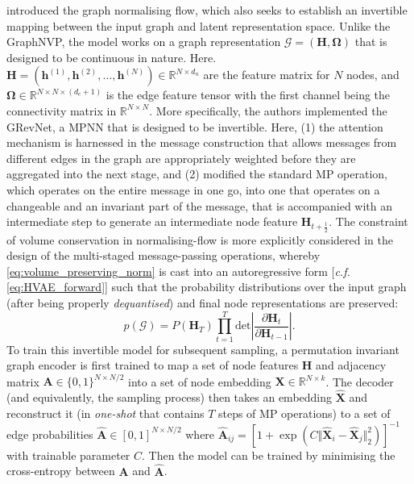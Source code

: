\citet{liu2019graph} introduced the graph normalising flow, which also seeks to establish an invertible mapping between the input graph and latent representation space. Unlike the GraphNVP, the model works on a graph representation $\mathcal{G}=(\bm{H},\boldsymbol{\Omega})$ that is designed to be continuous in nature. Here. $\bm{H}=\left(\bm{h}^{(1)},\bm{h}^{(2)},\ldots,\bm{h}^{(N)}\right)\in\mathbb{R}^{N\times d_n}$ are the feature matrix for $N$ nodes, and $\boldsymbol{\Omega}\in \mathbb{R}^{ N\times N\times (d_e+1) }$ is the edge feature tensor with the first channel being the connectivity matrix in $\mathbb{R}^{N\times N}$. More specifically, the authors implemented the GRevNet,  a MPNN that is designed to be invertible. Here, (1) the attention mechanism\cite{vaswani2017attention} is harnessed in the message construction that allows messages from different edges in the graph are appropriately weighted before they are aggregated into the next stage, and (2) modified the standard MP operation, which operates on the entire message in one go, into one that operates on a changeable and an invariant part of the message, that is accompanied with an intermediate step to generate an intermediate node feature $\bm{H}_{t+\scriptscriptstyle\frac{1}{2}}$. The constraint of volume conservation in normalising-flow is more explicitly considered in the design of the multi-staged message-passing operations, whereby \cref{eq:volume_preserving_norm} is cast into an autoregressive form [\emph{c.f.} \cref{eq:HVAE_forward}] such that the probability distributions over the input graph (after being properly \emph{dequantised}) and final node representations are preserved:
\begin{equation*}
    p(\mathcal{G})=P(\bm{H}_T)\prod_{t=1}^T\mathrm{det}\left\vert \frac{\partial \bm{H}_t}{\partial \bm{H}_{t-1}}  \right\vert.
\end{equation*}
To train this invertible model for subsequent sampling, a permutation invariant graph encoder is first trained to map a set of node features $\bm{H}$ and adjacency matrix $\bm{A}\in\{0,1\}^{N\times N/2}$ into a set of node embedding $\bm{X}\in\mathbb{R}^{N\times k}$. The decoder (and equivalently, the sampling process) then takes an embedding $\hat{\bm{X}}$ and reconstruct it (in \emph{one-shot} that contains $T$ steps of MP operations) to a set of edge probabilities $\hat{\bm{A}}\in [0,1]^{N\times N/2}$ where $\hat{\bm{A}}_{ij}=[1+\exp (C \Vert \hat{\bm{X}}_i-\hat{\bm{X}}_j \Vert_2^2) ]^{-1}$ with trainable parameter $C$. Then the model can be trained by minimising the cross-entropy between $\bm{A}$ and $\hat{\bm{A}}$.

